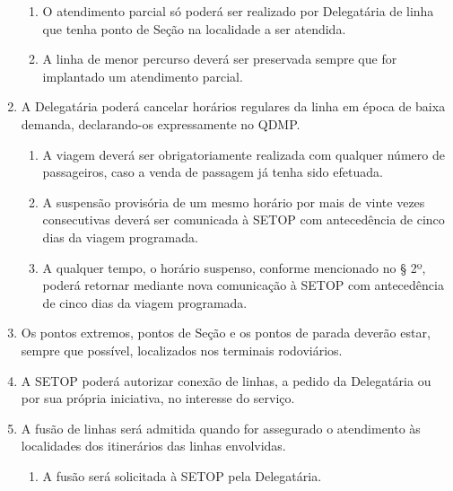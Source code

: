 \begin{enumerate}[resume, label=Art. \arabic*]
\begin{enumerate}[label= \S \arabic*] %

\item O atendimento parcial só poderá ser realizado por Delegatária de linha que tenha ponto de Seção na localidade a ser atendida.

\item A linha de menor percurso deverá ser preservada sempre que for implantado um atendimento parcial.

\end{enumerate}

\item A Delegatária poderá cancelar horários regulares da linha em época de baixa demanda, declarando-os expressamente no QDMP.

\begin{enumerate}[label= \S \arabic*] %

\item A viagem deverá ser obrigatoriamente realizada com qualquer número de passageiros, caso a venda de passagem já tenha sido efetuada.

\item A suspensão provisória de um mesmo horário por mais de vinte vezes consecutivas deverá ser comunicada à SETOP com antecedência de cinco dias da viagem programada.

\item A qualquer tempo, o horário suspenso, conforme mencionado no § 2º, poderá retornar mediante nova comunicação à SETOP com antecedência de cinco dias da viagem programada.

\end{enumerate}

\item Os pontos extremos, pontos de Seção e os pontos de parada deverão estar, sempre que possível, localizados nos terminais rodoviários.


\item A SETOP poderá autorizar conexão de linhas, a pedido da Delegatária ou por sua própria iniciativa, no interesse do serviço.


\item A fusão de linhas será admitida quando for assegurado o atendimento às localidades dos itinerários das linhas envolvidas.

\begin{enumerate}[label= \S \arabic*] %

\item A fusão será solicitada à SETOP pela Delegatária.


\end{enumerate}
\end{enumerate}
